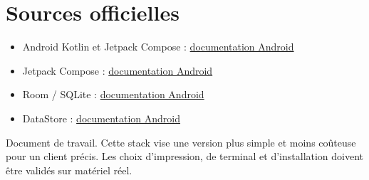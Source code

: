 \documentclass[11pt,a4paper]{article}
\newcommand{\source}[2]{\href{#2}{#1}}
\begin{document}
\section{Sources officielles}

{\footnotesize
\begin{itemize}[itemsep=0pt,topsep=0pt,leftmargin=4mm]
  \item Android Kotlin et Jetpack Compose :
  \source{documentation Android}{https://developer.android.com/jetpack/compose/kotlin}
  \item Jetpack Compose :
  \source{documentation Android}{https://developer.android.com/compose}
  \item Room / SQLite :
  \source{documentation Android}{https://developer.android.com/codelabs/basic-android-kotlin-compose-persisting-data-room}
  \item DataStore :
  \source{documentation Android}{https://developer.android.com/datastore}
\end{itemize}
}

\vfill
{\small\color{textgray}
Document de travail. Cette stack vise une version plus simple et moins coûteuse pour un client
précis. Les choix d'impression, de terminal et d'installation doivent être validés sur matériel réel.
}
\end{document}
